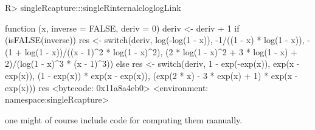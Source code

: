 \documentclass[
]{jss}
\newcommand{\1}{\mathcal{I}} \newcommand{\bZero}{\boldsymbol{0}}
\begin{document}
\begin{CodeChunk}
\begin{CodeInput}
R> singleRcapture:::singleRinternalcloglogLink
\end{CodeInput}
\begin{CodeOutput}
function (x, inverse = FALSE, deriv = 0) 
{
    deriv <- deriv + 1
    if (isFALSE(inverse)) {
        res <- switch(deriv, log(-log(1 - x)), -1/((1 - x) * 
            log(1 - x)), -(1 + log(1 - x))/((x - 1)^2 * log(1 - 
            x)^2), (2 * log(1 - x)^2 + 3 * log(1 - x) + 2)/(log(1 - 
            x)^3 * (x - 1)^3))
    }
    else {
        res <- switch(deriv, 1 - exp(-exp(x)), exp(x - exp(x)), 
            (1 - exp(x)) * exp(x - exp(x)), (exp(2 * x) - 3 * 
                exp(x) + 1) * exp(x - exp(x)))
    }
    res
}
<bytecode: 0x11a8a4eb0>
<environment: namespace:singleRcapture>
\end{CodeOutput}
\end{CodeChunk}

\normalsize

one might of course include code for computing them manually.


\end{document}
